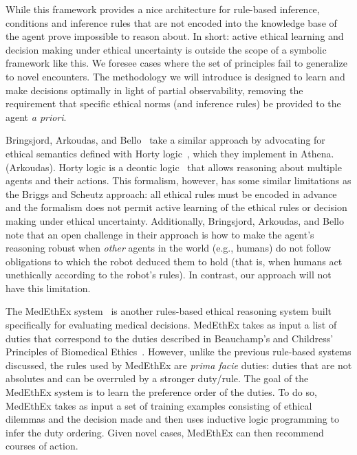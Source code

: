 \documentclass[11pt]{article}
\begin{document}
While this framework provides a nice architecture for rule-based inference, conditions and inference rules that are not encoded into the knowledge base of the agent prove impossible to reason about. In short: active ethical learning and decision making under ethical uncertainty is outside the scope of a symbolic framework like this. We foresee cases where the set of principles fail to generalize to novel encounters. The methodology we will introduce is designed to learn and make decisions optimally in light of partial observability, removing the requirement that specific ethical norms (and inference rules) be provided to the agent {\it a priori}.

Bringsjord, Arkoudas, and Bello~ take a similar approach by advocating for ethical semantics defined with Horty logic~\cite{horty2001agency,murakami2004utilitarian}, which they implement in Athena.%
 (Arkoudas).
Horty logic is a deontic logic~\cite{clarke1975logical} that allows reasoning about multiple agents and their actions. This formalism, however, has some similar limitations as the Briggs and Scheutz approach: all ethical rules must be encoded in advance and the formalism does not permit active learning of the ethical rules or decision making under ethical uncertainty. Additionally, Bringsjord, Arkoudas, and Bello note that an open challenge in their approach is how to make the agent's reasoning robust when {\em other} agents in the world (e.g., humans) do not follow obligations to which the robot deduced them to hold (that is, when humans act unethically according to the robot's rules). In contrast, our approach will not have this limitation.

The MedEthEx system~\cite{anderson2006medethex} is another rules-based ethical reasoning system built specifically for evaluating medical decisions. MedEthEx takes as input a list of duties that correspond to the duties described in Beauchamp's and Childress' Principles of Biomedical Ethics~. However, unlike the previous rule-based systems discussed, the rules used by MedEthEx are {\em prima facie} duties: duties that are not absolutes and can be overruled by a stronger duty/rule. The goal of the MedEthEx system is to learn the preference order of the duties. To do so, MedEthEx takes as input a set of training examples consisting of ethical dilemmas and the decision made and then uses inductive logic programming to infer the duty ordering. Given novel cases, MedEthEx can then recommend courses of action.
\end{document}
